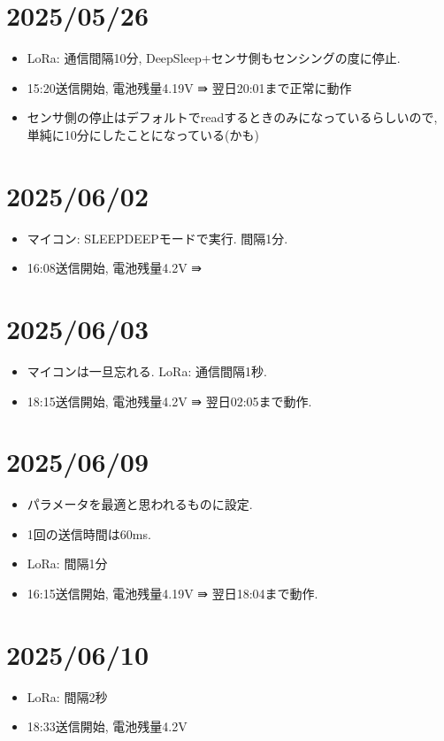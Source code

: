 \section{2025/05/26}
\begin{itemize}
    \item LoRa: 通信間隔10分, DeepSleep+センサ側もセンシングの度に停止.
    \item 15:20送信開始, 電池残量4.19V ⇛ 翌日20:01まで正常に動作
    \item センサ側の停止はデフォルトでreadするときのみになっているらしいので, 単純に10分にしたことになっている(かも)
\end{itemize}

\section{2025/06/02}
\begin{itemize}
    \item マイコン: SLEEPDEEPモードで実行. 間隔1分.
    \item 16:08送信開始, 電池残量4.2V ⇛ 
\end{itemize}


\section{2025/06/03}
\begin{itemize}
    \item マイコンは一旦忘れる. LoRa: 通信間隔1秒. 
    \item 18:15送信開始, 電池残量4.2V ⇛ 翌日02:05まで動作.
\end{itemize}

\section{2025/06/09}
\begin{itemize}
    \item パラメータを最適と思われるものに設定. 
    \item 1回の送信時間は60ms. 
    \item LoRa: 間隔1分
    \item 16:15送信開始, 電池残量4.19V ⇛ 翌日18:04まで動作.
\end{itemize}

\section{2025/06/10}
\begin{itemize}
    \item LoRa: 間隔2秒
    \item 18:33送信開始, 電池残量4.2V
\end{itemize}




